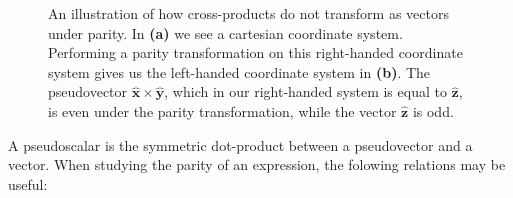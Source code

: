 \begin{figure}[h!]
\begin{subfigure}{.33\textwidth}
  \caption{}
\end{subfigure}
\caption{An illustration of how cross-products do not transform as vectors under parity. In \textbf{(a)} we see a cartesian coordinate system. Performing a parity transformation on this right-handed coordinate system gives us the left-handed coordinate system in \textbf{(b)}. The pseudovector $\mathbold{\hat{x}}\times\mathbold{\hat{y}}$, which in our right-handed system is equal to $\mathbold{\hat{z}}$, is even under the parity transformation, while the vector $\mathbold{\hat{z}}$ is odd. }
\label{fig:Parity}
\end{figure}
A pseudoscalar is the symmetric dot-product between a pseudovector and a vector. When studying the parity of an expression, the folowing relations may be useful:
